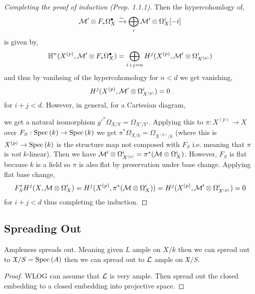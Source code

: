 \documentclass[12pt]{article}
\begin{document}
\begin{proof}[Completing the proof of induction (Prop. 1.1.1)]
Then the hypercohomlogy of,
\[ \mathcal{M}' \otimes F_* \Omega^\bullet_X \xrightarrow{\sim} \bigoplus_{i} \mathcal{M}' \otimes \Omega^i_X [-i] \]
is given by,
\[ \mathbb{H}^n(X^{(p)}, \mathcal{M}' \otimes F_* \Omega_X^\bullet) = \bigoplus_{i + j = n} H^j(X^{(p)}, \mathcal{M}' \otimes \Omega^i_{X^{(p)}}) \]
and thus by vanihsing of the hypercohomology for $n < d$ we get vanishing,
\[ H^j(X^{(p)}, \mathcal{M}' \otimes \Omega^i_{X^{(p)}}) = 0 \]
for $i + j < d$. However, in general, for a Cartesian diagram,
\begin{center}
\end{center}
we get a natural isomorphism $g'^* \Omega_{X/Y} = \Omega_{X'/Y'}$. Applying this to $\pi : X^{(p)} \to X$ over $F_S : \mathrm{Spec}\left( k \right) \to \mathrm{Spec}\left( k \right)$ we get $\pi^* \Omega_{X/k} = \Omega_{X^{(p)}/k}$ (where this is $X^{(p)} \to \mathrm{Spec}\left( k \right)$ is the structure map not composed with $F_S$ i.e. meaning that $\pi$ is \textit{not} $k$-linear). Then we have $\mathcal{M}' \otimes \Omega^i_{X^{(p)}} = \pi^* (\mathcal{M} \otimes \Omega^i_X)$. However, $F_S$ is flat because $k$ is a field so $\pi$ is also flat by preservation under base change. Applying flat base change,
\[ F_S^* H^j(X, \mathcal{M} \otimes \Omega^i_X) = H^j(X^{(p)}, \pi^*(\mathcal{M} \otimes \Omega^i_X)) = H^j(X^{(p)}, \mathcal{M}' \otimes \Omega^i_{X^{(p)}}) = 0 \]
for $i + j < d$ thus completing the induction.
\end{proof}




\subsection{Spreading Out}

\newcommand{\X}{\mathfrak{X}}

\begin{prop}
Ampleness spreads out. Meaning given $L$ ample on $X / k$ then we can spread out to $\X / S = \Spec{A}$ then we can spread out to $\mathcal{L}$ ample on $\X / S$. 
\end{prop}

\begin{proof}
WLOG can assume that $\mathcal{L}$ is very ample. Then spread out the closed embedding to a closed embedding into projective space.
\end{proof}
\end{document}
